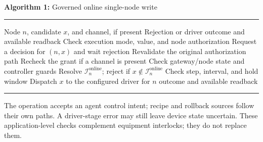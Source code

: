 \par\medskip
\noindent\begin{minipage}{\columnwidth}
\small
\noindent\textbf{Algorithm 1:} Governed online single-node write
\par\kern2pt\hrule\kern2pt
\begin{algorithmic}[1]
\Require Node $n$, candidate $x$, and channel, if present
\Ensure Rejection or driver outcome and available readback
\State Check execution mode, value, and node authorization
  \State Request a decision for $(n,x)$ and wait
    \State \Return rejection
  \EndIf
  \State Revalidate the original authorization path
\EndIf
\State Recheck the grant if a channel is present
\State Check gateway/node state and controller guards
\State Resolve $\mathcal{I}^{\mathrm{online}}_n$; reject if $x\notin\mathcal{I}^{\mathrm{online}}_n$
  \State Check step, interval, and hold window
\EndIf
\State Dispatch $x$ to the configured driver for $n$
\State \Return outcome and available readback
\end{algorithmic}
\kern2pt\hrule
\end{minipage}
\par\medskip

The operation accepts an agent control intent; recipe and rollback sources follow
their own paths. A driver-stage error may still leave device state uncertain. These
application-level checks complement equipment interlocks; they do not replace them.


